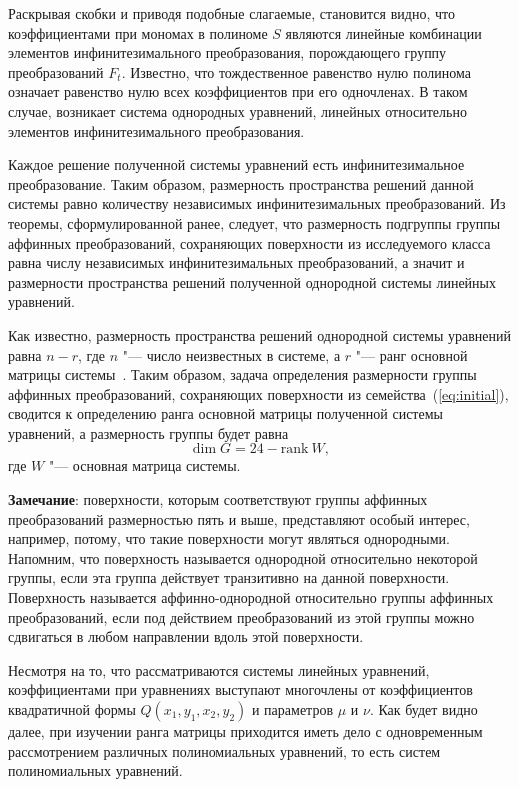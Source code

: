 \documentclass[../main.tex]{subfiles}
\begin{document}
Раскрывая скобки и приводя подобные слагаемые, становится видно, что коэффициентами при мономах в полиноме $S$ являются линейные комбинации элементов инфинитезимального преобразования, порождающего группу преобразований $F_t$. Известно, что тождественное равенство нулю полинома означает равенство нулю всех коэффициентов при его одночленах. В таком случае, возникает система однородных уравнений, линейных относительно элементов инфинитезимального преобразования. 

Каждое решение полученной системы уравнений есть инфинитезимальное преобразование. Таким образом, размерность пространства решений данной системы равно количеству независимых инфинитезимальных преобразований. Из теоремы, сформулированной ранее, следует, что размерность подгруппы группы аффинных преобразований, сохраняющих поверхности из исследуемого класса равна числу независимых инфинитезимальных преобразований, а значит и размерности пространства решений полученной однородной системы линейных уравнений.

Как известно, размерность пространства решений однородной системы уравнений равна $n - r$, где $n$ "--- число неизвестных в системе, а $r$ "--- ранг основной матрицы системы~\cite{costrikin_va1}. Таким образом, задача определения размерности группы аффинных преобразований, сохраняющих поверхности из семейства~(\ref{eq:initial}), сводится к определению ранга основной матрицы полученной системы уравнений, а размерность группы будет равна
\begin{equation}\label{eq:dim_rank}
\dim G = 24 - \mathrm{rank}~W,
\end{equation}
где $W$ "--- основная матрица системы. 

\textbf{Замечание}: поверхности, которым соответствуют группы аффинных преобразований размерностью пять и выше, представляют особый интерес, например, потому, что такие поверхности могут являться однородными. Напомним, что поверхность называется однородной относительно некоторой группы, если эта группа действует транзитивно на данной поверхности. Поверхность называется аффинно-однородной относительно группы аффинных преобразований, если под действием преобразований из этой группы можно сдвигаться в любом направлении вдоль этой поверхности.

Несмотря на то, что рассматриваются системы линейных уравнений, коэффициентами при уравнениях выступают многочлены от коэффициентов квадратичной формы $Q(x_1, y_1, x_2, y_2)$ и параметров $\mu$ и $\nu$. Как будет видно далее, при изучении ранга матрицы приходится иметь дело с одновременным рассмотрением различных полиномиальных уравнений, то есть систем полиномиальных уравнений.  
\end{document}
